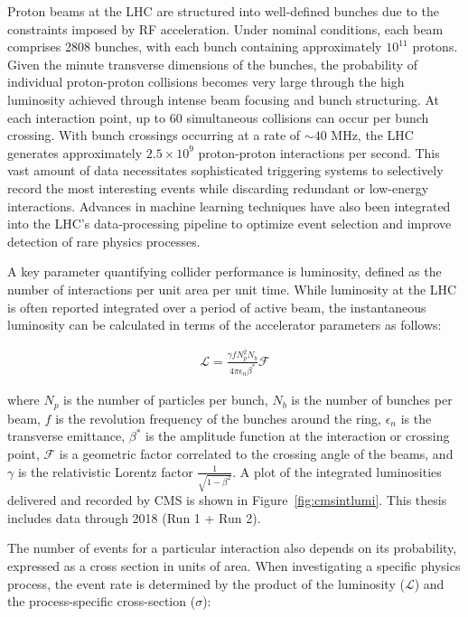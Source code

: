 Proton beams at the LHC are structured into well-defined bunches due to the constraints imposed by RF acceleration. Under nominal conditions, each beam comprises 2808 bunches, with each bunch containing approximately $10^{11}$ protons. Given the minute transverse dimensions of the bunches, the probability of individual proton-proton collisions becomes very large through the high luminosity achieved through intense beam focusing and bunch structuring. At each interaction point, up to 60 simultaneous collisions can occur per bunch crossing. With bunch crossings occurring at a rate of $\sim40$ MHz, the LHC generates approximately $2.5 \times 10^9$ proton-proton interactions per second. This vast amount of data necessitates sophisticated triggering systems to selectively record the most interesting events while discarding redundant or low-energy interactions. Advances in machine learning techniques have also been integrated into the LHC's data-processing pipeline to optimize event selection and improve detection of rare physics processes.

A key parameter quantifying collider performance is luminosity, defined as the number of interactions per unit area per unit time. While luminosity at the LHC is often reported integrated over a period of active beam, the instantaneous luminosity can be calculated in terms of the accelerator parameters as follows:

\begin{equation}
\label{eq:lumi}
\begin{gathered}
\mathcal{L} = \frac{\gamma f N_p^2 N_b}{4 \pi \epsilon_n \beta^*} \mathcal{F}
\end{gathered}
\end{equation}

where $N_p$ is the number of particles per bunch, $N_b$ is the number of bunches per beam, $f$ is the revolution frequency of the bunches around the ring, $\epsilon_n$ is the transverse emittance, $\beta^*$ is the amplitude function at the interaction or crossing point, $\mathcal{F}$ is a geometric factor correlated to the crossing angle of the beams, and $\gamma$ is the relativistic Lorentz factor $\frac{1}{\sqrt{1-\beta^2}}$. A plot of the integrated luminosities delivered and recorded by CMS is shown in Figure~\ref{fig:cmsintlumi}. This thesis includes data through 2018 (Run 1 + Run 2).

The number of events for a particular interaction also depends on its probability, expressed as a cross section in units of area. When investigating a specific physics process, the event rate is determined by the product of the luminosity ($\mathcal{L}$) and the process-specific cross-section ($\sigma$):

